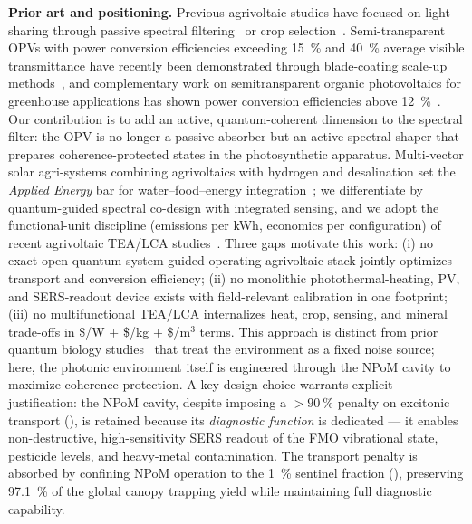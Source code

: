 \documentclass[preprint,12pt]{elsarticle}
\begin{document}
\textbf{Prior art and positioning.} Previous agrivoltaic studies have focused on light-sharing through passive spectral filtering~\cite{Thompson2020} or crop selection~\cite{Dupraz2011}.
Semi-transparent OPVs with power conversion efficiencies exceeding \qty{15}{\percent} and \qty{40}{\percent} average visible transmittance have recently been demonstrated through blade-coating scale-up methods~\cite{Ravishankar2024}, and complementary work on semitransparent organic photovoltaics for greenhouse applications has shown power conversion efficiencies above \qty{12}{\percent}~\cite{Alshareef2024}.
Our contribution is to add an active, quantum-coherent dimension to the spectral filter: the OPV is no longer a passive absorber but an active spectral shaper that prepares coherence-protected states in the photosynthetic apparatus. Multi-vector solar agri-systems combining agrivoltaics with hydrogen and desalination set the \textit{Applied Energy} bar for water--food--energy integration~\cite{TemizDincer2024}; we differentiate by quantum-guided spectral co-design with integrated sensing, and we adopt the functional-unit discipline (emissions per kWh, economics per configuration) of recent agrivoltaic TEA/LCA studies~\cite{Ravilla2024,Bellone2024}. Three gaps motivate this work: (i) no exact-open-quantum-system-guided operating agrivoltaic stack jointly optimizes transport and conversion efficiency; (ii) no monolithic photothermal-heating, PV, and SERS-readout device exists with field-relevant calibration in one footprint; (iii) no multifunctional TEA/LCA internalizes heat, crop, sensing, and mineral trade-offs in \$/W $+$ \$/kg $+$ \$/m$^3$ terms.
This approach is distinct from prior quantum biology studies~\cite{Scholes2015} that treat the environment as a fixed noise source; here, the photonic environment itself is engineered through the NPoM cavity to maximize coherence protection.
A key design choice warrants explicit justification: the NPoM cavity, despite imposing a $>\qty{90}{\percent}$ penalty on excitonic transport (), is retained because its \emph{diagnostic function} is dedicated --- it enables non-destructive, high-sensitivity SERS readout of the FMO vibrational state, pesticide levels, and heavy-metal contamination. The transport penalty is absorbed by confining NPoM operation to the \qty{1}{\percent} sentinel fraction (), preserving \qty{97.1}{\percent} of the global canopy trapping yield while maintaining full diagnostic capability.
\end{document}
